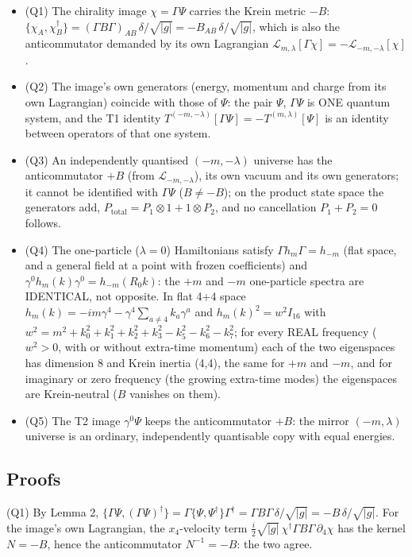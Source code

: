 \documentclass[11pt]{article}
\begin{document}
\begin{itemize}
\item (Q1) The chirality image $\chi = \Gamma\Psi$ carries the Krein metric $-B$: $\{\chi_A, \chi^\dagger_B\} = (\Gamma B\Gamma)_{AB}\,\delta/\sqrt{|g|} = -B_{AB}\,\delta/\sqrt{|g|}$, which is also the anticommutator demanded by its own Lagrangian $\mathcal{L}_{m,\lambda}[\Gamma\chi] = -\mathcal{L}_{-m,-\lambda}[\chi]$.
\item (Q2) The image's own generators (energy, momentum and charge from its own Lagrangian) coincide with those of $\Psi$: the pair $\Psi$, $\Gamma\Psi$ is ONE quantum system, and the T1 identity $T^{(-m,-\lambda)}[\Gamma\Psi] = -T^{(m,\lambda)}[\Psi]$ is an identity between operators of that one system.
\item (Q3) An independently quantised $(-m,-\lambda)$ universe has the anticommutator $+B$ (from $\mathcal{L}_{-m,-\lambda}$), its own vacuum and its own generators; it cannot be identified with $\Gamma\Psi$ ($B \neq -B$); on the product state space the generators add, $P_{\mathrm{total}} = P_1\otimes 1 + 1\otimes P_2$, and no cancellation $P_1 + P_2 = 0$ follows.
\item (Q4) The one-particle ($\lambda = 0$) Hamiltonians satisfy $\Gamma h_m\Gamma = h_{-m}$ (flat space, and a general field at a point with frozen coefficients) and $\gamma^0h_m(k)\gamma^0 = h_{-m}(R_0k)$: the $+m$ and $-m$ one-particle spectra are IDENTICAL, not opposite. In flat 4+4 space $h_m(k) = -im\gamma^4 - \gamma^4\sum_{a \neq 4}k_a\gamma^a$ and $h_m(k)^2 = w^2 I_{16}$ with $w^2 = m^2 + k_0^2 + k_1^2 + k_2^2 + k_3^2 - k_5^2 - k_6^2 - k_7^2$; for every REAL frequency ($w^2 > 0$, with or without extra-time momentum) each of the two eigenspaces has dimension 8 and Krein inertia (4,4), the same for $+m$ and $-m$, and for imaginary or zero frequency (the growing extra-time modes) the eigenspaces are Krein-neutral ($B$ vanishes on them).
\item (Q5) The T2 image $\gamma^0\Psi$ keeps the anticommutator $+B$: the mirror $(-m,\lambda)$ universe is an ordinary, independently quantisable copy with equal energies.
\end{itemize}

\subsection{Proofs}

(Q1) By Lemma 2, $\{\Gamma\Psi, (\Gamma\Psi)^\dagger\} = \Gamma\{\Psi, \Psi^\dagger\}\Gamma^\dagger = \Gamma B\Gamma\,\delta/\sqrt{|g|} = -B\,\delta/\sqrt{|g|}$. For the image's own Lagrangian, the $x_4$-velocity term $\frac{i}{2}\sqrt{|g|}\,\chi^\dagger\Gamma B\Gamma\,\partial_4\chi$ has the kernel $N = -B$, hence the anticommutator $N^{-1} = -B$: the two agree.
\end{document}

